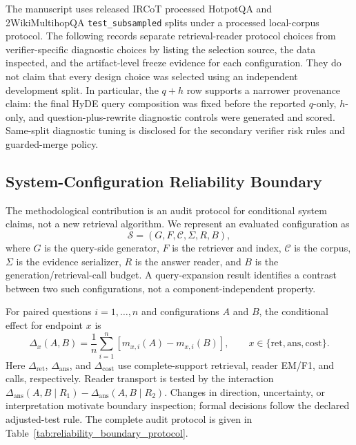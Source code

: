 \documentclass[pdflatex,sn-basic,Numbered]{sn-jnl}
\newcounter{algorithm}
\begin{document}
The manuscript uses released IRCoT processed HotpotQA and 2WikiMultihopQA \texttt{test\_subsampled} splits under a processed local-corpus protocol. The following records separate retrieval-reader protocol choices from verifier-specific diagnostic choices by listing the selection source, the data inspected, and the artifact-level freeze evidence for each configuration. They do not claim that every design choice was selected using an independent development split. In particular, the $q+h$ row supports a narrower provenance claim: the final HyDE query composition was fixed before the reported $q$-only, $h$-only, and question-plus-rewrite diagnostic controls were generated and scored. Same-split diagnostic tuning is disclosed for the secondary verifier risk rules and guarded-merge policy.

\subsection{System-Configuration Reliability Boundary}
\label{supp:system_configuration_boundary}

The methodological contribution is an audit protocol for conditional system claims, not a new retrieval algorithm. We represent an evaluated configuration as
\[
\mathcal{S}=(G,F,\mathcal{C},\Sigma,R,B),
\]
where $G$ is the query-side generator, $F$ is the retriever and index, $\mathcal{C}$ is the corpus, $\Sigma$ is the evidence serializer, $R$ is the answer reader, and $B$ is the generation/retrieval-call budget. A query-expansion result identifies a contrast between two such configurations, not a component-independent property.

For paired questions $i=1,\ldots,n$ and configurations $A$ and $B$, the conditional effect for endpoint $x$ is
\[
\Delta_x(A,B)=\frac{1}{n}\sum_{i=1}^{n}\left[m_{x,i}(A)-m_{x,i}(B)\right],
\qquad x\in\{\mathrm{ret},\mathrm{ans},\mathrm{cost}\}.
\]
Here $\Delta_{\mathrm{ret}}$, $\Delta_{\mathrm{ans}}$, and $\Delta_{\mathrm{cost}}$ use complete-support retrieval, reader EM/F1, and calls, respectively. Reader transport is tested by the interaction $\Delta_{\mathrm{ans}}(A,B\mid R_1)-\Delta_{\mathrm{ans}}(A,B\mid R_2)$. Changes in direction, uncertainty, or interpretation motivate boundary inspection; formal decisions follow the declared adjusted-test rule. The complete audit protocol is given in Table~\ref{tab:reliability_boundary_protocol}.


\FloatBarrier


\end{document}
